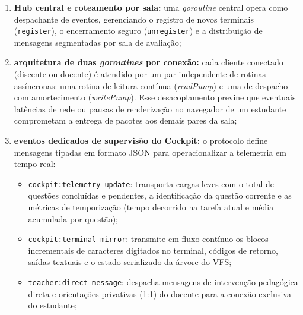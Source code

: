 \begin{enumerate}
    \item \textbf{Hub central e roteamento por sala:} uma \textit{goroutine} central opera como despachante de eventos, gerenciando o registro de novos terminais (\texttt{register}), o encerramento seguro (\texttt{unregister}) e a distribuição de mensagens segmentadas por sala de avaliação;

    \item \textbf{arquitetura de duas \textit{goroutines} por conexão:} cada cliente conectado (discente ou docente) é atendido por um par independente de rotinas assíncronas: uma rotina de leitura contínua (\textit{readPump}) e uma de despacho com amortecimento (\textit{writePump}). Esse desacoplamento previne que eventuais latências de rede ou pausas de renderização no navegador de um estudante comprometam a entrega de pacotes aos demais pares da sala;

    \item \textbf{eventos dedicados de supervisão do Cockpit:} o protocolo define mensagens tipadas em formato JSON para operacionalizar a telemetria em tempo real:
    \begin{itemize}
        \item \texttt{cockpit:telemetry-update}: transporta cargas leves com o total de questões concluídas e pendentes, a identificação da questão corrente e as métricas de temporização (tempo decorrido na tarefa atual e média acumulada por questão);
        \item \texttt{cockpit:terminal-mirror}: transmite em fluxo contínuo os blocos incrementais de caracteres digitados no terminal, códigos de retorno, saídas textuais e o estado serializado da árvore do VFS;
        \item \texttt{teacher:direct-message}: despacha mensagens de intervenção pedagógica direta e orientações privativas (1:1) do docente para a conexão exclusiva do estudante;
    \end{itemize}


\end{enumerate}
